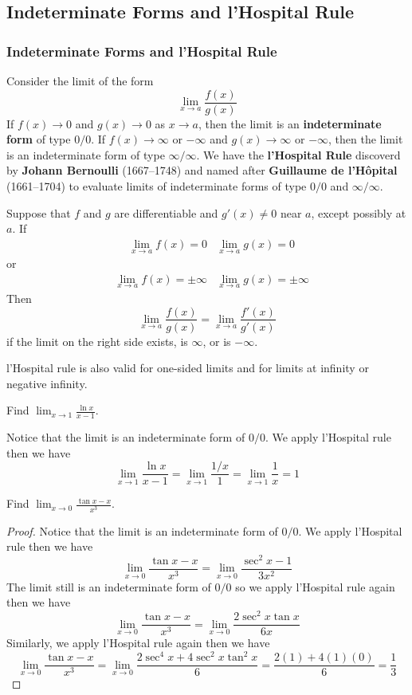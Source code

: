 \subsection{Indeterminate Forms and l'Hospital Rule}

\subsubsection*{Indeterminate Forms and l'Hospital Rule}
Consider the limit of the form \[\lim_{x\to a}\frac{f(x)}{g(x)}\]
If \(f(x)\to 0\) and \(g(x)\to 0\) as \(x\to a\), then the limit is an
\textbf{indeterminate form} of type \(0/0\).
If \(f(x)\to\infty\) or \(-\infty\) and \(g(x)\to\infty\) or \(-\infty\),
then the limit is an indeterminate form of type \(\infty/\infty\).
We have the \textbf{l'Hospital Rule} discoverd by
\textbf{Johann Bernoulli} (1667--1748) and named after
\textbf{Guillaume de l'Hôpital} (1661--1704) to evaluate limits of indeterminate
forms of type \(0/0\) and \(\infty/\infty\).
\begin{theorem}
    Suppose that \(f\) and \(g\) are differentiable and \(g'(x)\neq 0\) near \(a\),
    except possibly at \(a\).
    If
    \begin{align*}
        &\lim_{x\to a}f(x)=0&\lim_{x\to a}g(x)=0
    \end{align*}
    or
    \begin{align*}
        &\lim_{x\to a}f(x)=\pm\infty&\lim_{x\to a}g(x)=\pm\infty
    \end{align*}
    Then
    \[\lim_{x\to a}\frac{f(x)}{g(x)}=\lim_{x\to a}\frac{f'(x)}{g'(x)}\]
    if the limit on the right side exists, is \(\infty\), or is \(-\infty\).
\end{theorem}
l'Hospital rule is also valid for one-sided limits and for limits at infinity
or negative infinity.
\begin{problem}
    Find \(\displaystyle{\lim_{x\to 1}\frac{\ln x}{x-1}}\).
\end{problem}
\begin{solution}
    Notice that the limit is an indeterminate form of \(0/0\).
    We apply l'Hospital rule then we have
    \[\lim_{x\to 1}\dfrac{\ln x}{x-1}=\lim_{x\to 1}\frac{1/x}{1}
    =\lim_{x\to 1}\frac{1}{x}=1\]
\end{solution}
\begin{problem}
    Find \(\displaystyle{\lim_{x\to 0}\frac{\tan x-x}{x^3}}\).
\end{problem}
\begin{proof}
    Notice that the limit is an indeterminate form of \(0/0\).
    We apply l'Hospital rule then we have
    \[\lim_{x\to 0}\frac{\tan x-x}{x^3}=\lim_{x\to 0}\frac{\sec^2 x-1}{3x^2}\]
    The limit still is an indeterminate form of \(0/0\) so we apply
    l'Hospital rule again then we have
    \[\lim_{x\to 0}\frac{\tan x-x}{x^3}
    =\lim_{x\to 0}\frac{2\sec^2 x\tan x}{6x}\]
    Similarly, we apply l'Hospital rule again then we have
    \[\lim_{x\to 0}\frac{\tan x-x}{x^3}
    =\lim_{x\to 0}\frac{2\sec^4 x+4\sec^2 x\tan^2 x}{6}
    =\frac{2(1)+4(1)(0)}{6}=\frac{1}{3}\]
\end{proof}

